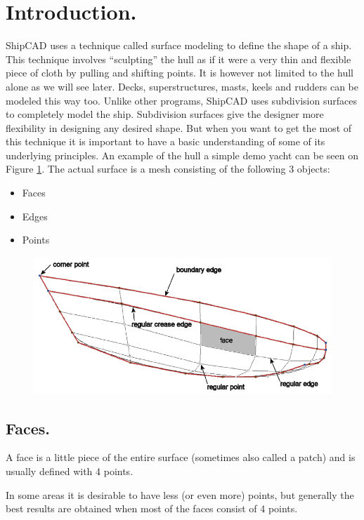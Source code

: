\documentclass[12pt]{article}
\begin{document}
\section {Introduction.}
ShipCAD uses a technique called surface modeling to define the shape
of a ship. This technique involves “sculpting” the hull as if it were
a very thin and flexible piece of cloth by pulling and shifting
points. It is however not limited to the hull alone as we will see
later. Decks, superstructures, masts, keels and rudders can be modeled
this way too. Unlike other programs, ShipCAD uses subdivision surfaces
to completely model the ship. Subdivision surfaces give the designer
more flexibility in designing any desired shape. But when you want to
get the most of this technique it is important to have a basic
understanding of some of its underlying principles. An example of the
hull a simple demo yacht can be seen on Figure \ref{fig:mesh}. The
actual surface is a mesh consisting of the following 3 objects:

\begin{itemize}
  \item Faces
  \item Edges
  \item Points
\end{itemize}

\begin{figure}[h]
        \centering
        \includegraphics[width=15cm,natwidth=769,natheight=355]{figure1.png}
        \caption{}
        \label{fig:mesh}
\end{figure}

\subsection{Faces.}
A face is a little piece of the entire surface (sometimes also called
a patch) and is usually defined with 4 points.\par In some areas it is
desirable to have less (or even more) points, but generally the best
results are obtained when most of the faces consist of 4 points.
\end{document}
